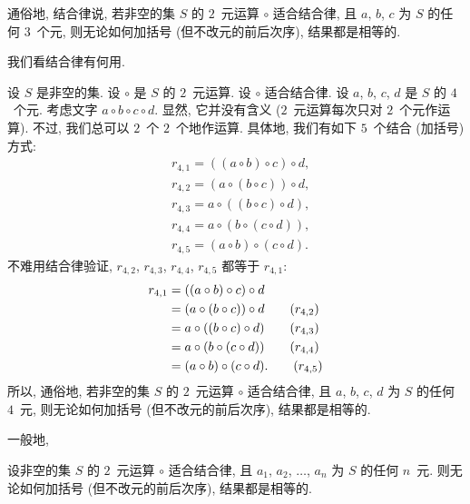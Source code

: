 \documentclass[../libro.tex]{subfiles}
\begin{document}
通俗地, 结合律说,
若非空的集 \(S\) 的 \(2\)~元运算 \(\circ\) 适合结合律,
且 \(a\), \(b\), \(c\) 为 \(S\) 的任何 \(3\)~个元,
则无论如何加括号
(但不改元的前后次序),
结果都是相等的.

我们看结合律有何用.

设 \(S\) 是非空的集.
设 \(\circ\) 是 \(S\) 的 \(2\)~元运算.
设 \(\circ\) 适合结合律.
设 \(a\), \(b\), \(c\), \(d\) 是 \(S\) 的 \(4\)~个元.
考虑文字 \(a \circ b \circ c \circ d\).
显然, 它并没有含义
(\(2\)~元运算每次只对 \(2\)~个元作运算).
不过, 我们总可以 \(2\)~个 \(2\)~个地作运算.
具体地, 我们有如下 \(5\)~个结合 (加括号) 方式:
\begin{align*}
    & r_{4,1} = ((a \circ b) \circ c) \circ d, \\
    & r_{4,2} = (a \circ (b \circ c)) \circ d, \\
    & r_{4,3} = a \circ ((b \circ c) \circ d), \\
    & r_{4,4} = a \circ (b \circ (c \circ d)), \\
    & r_{4,5} = (a \circ b) \circ (c \circ d).
\end{align*}
不难用结合律验证,
\(r_{4,2}\), \(r_{4,3}\), \(r_{4,4}\), \(r_{4,5}\)
都等于 \(r_{4,1}\):
\begingroup
\reqnomode
\begin{align*}
    r_{4,1}
    = {} & ((a \circ b) \circ c) \circ d
    \\
    = {} & (a \circ (b \circ c)) \circ d
    \tag*{(\(r_{4,2}\))}                  \\
    = {} & a \circ ((b \circ c) \circ d)
    \tag*{(\(r_{4,3}\))}                  \\
    = {} & a \circ (b \circ (c \circ d))
    \tag*{(\(r_{4,4}\))}                  \\
    = {} & (a \circ b) \circ (c \circ d).
    \tag*{(\(r_{4,5}\))}
\end{align*}
\endgroup
所以, 通俗地,
若非空的集 \(S\) 的 \(2\)~元运算 \(\circ\) 适合结合律,
且 \(a\), \(b\), \(c\), \(d\) 为 \(S\) 的任何 \(4\)~元,
则无论如何加括号
(但不改元的前后次序),
结果都是相等的.

一般地,

\begin{theorem}
    设非空的集 \(S\) 的 \(2\)~元运算 \(\circ\) 适合结合律,
    且 \(a_1\), \(a_2\), \(\dots\), \(a_n\) 为
    \(S\) 的任何 \(n\)~元.
    则无论如何加括号
    (但不改元的前后次序),
    结果都是相等的.
\end{theorem}
\end{document}
